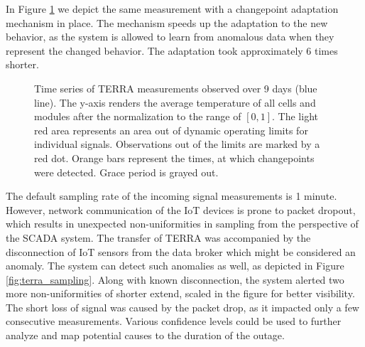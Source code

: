 In Figure \ref{fig:terra_change} we depict the same measurement with a changepoint adaptation mechanism in place. The mechanism speeds up the adaptation to the new behavior, as the system is allowed to learn from anomalous data when they represent the changed behavior. The adaptation took approximately 6 times shorter.

\begin{figure}
 \centering
 \caption{Time series of TERRA measurements observed over 9 days (blue line). The y-axis renders the average temperature of all cells and modules after the normalization to the range of $[0, 1]$. The light red area represents an area out of dynamic operating limits for individual signals. Observations out of the limits are marked by a red dot. Orange bars represent the times, at which changepoints were detected. Grace period is grayed out.}
 \label{fig:terra_change}
\end{figure}

The default sampling rate of the incoming signal measurements is 1 minute. However, network communication of the IoT devices is prone to packet dropout, which results in unexpected non-uniformities in sampling from the perspective of the SCADA system. The transfer of TERRA was accompanied by the disconnection of IoT sensors from the data broker which might be considered an anomaly. The system can detect such anomalies as well, as depicted in Figure \ref{fig:terra_sampling}. Along with known disconnection, the system alerted two more non-uniformities of shorter extend, scaled in the figure for better visibility. The short loss of signal was caused by the packet drop, as it impacted only a few consecutive measurements. Various confidence levels could be used to further analyze and map potential causes to the duration of the outage.

